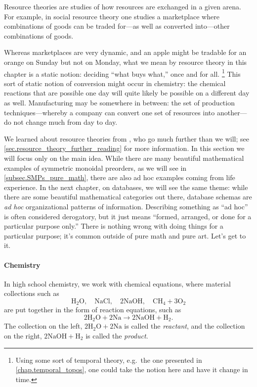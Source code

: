 \documentclass[7Sketches]{subfiles}
\begin{document}
Resource theories are studies of how resources are exchanged in a given arena. For example, in social resource theory one studies a marketplace where combinations of goods can be traded for---as well as converted into---other combinations of goods.

Whereas marketplaces are very dynamic, and an apple might be tradable for an orange on Sunday but not on Monday, what we mean by resource theory in this chapter is a static notion: deciding ``what buys what,'' once and for all.%
\footnote{Using some sort of temporal theory, e.g.\ the one presented in \cref{chap.temporal_topos}, one could take the notion here and have it change in time.}
This sort of static notion of conversion might occur in chemistry: the chemical reactions that are possible one day will quite likely be possible on a different day as well. Manufacturing may be somewhere in between: the set of production techniques---whereby a company can convert one set of resources into another---do not change much from day to day.

We learned about resource theories from
\cite{Coecke.Fritz.Spekkens:2016a,Fritz:2017a}, who go much further than we
will; see \cref{sec.resource_theory_further_reading} for more information.%
 In
this section we will focus only on the main idea. While there are many beautiful
mathematical examples of symmetric monoidal preorders, as we will see in
\cref{subsec.SMPs_pure_math}, there are also ad hoc examples coming from life
experience. In the next chapter, on databases, we will see the same theme: while
there are some beautiful mathematical categories out there, database schemas are
\emph{ad hoc} organizational patterns of information. Describing something as
``ad hoc'' is often considered derogatory, but it just means ``formed, arranged,
or done for a particular purpose only.'' There is nothing wrong with doing
things for a particular purpose; it's common outside of pure math and pure art. Let's get
to it.

\paragraph{Chemistry}%
\label{subsubsec.chemistry}%

In high school chemistry, we work with chemical equations, where material collections such as
\[\mathrm{H_2O},\quad \mathrm{NaCl},\quad \mathrm{2NaOH},\quad \mathrm{CH_4+3O_2}\]
are put together in the form of reaction equations, such as
\[\mathrm{2H_2O+2Na\to 2NaOH+H_2}.\]
The collection on the left, $\mathrm{2H_2O+2Na}$ is called the \emph{reactant}, and the collection on the right, $\mathrm{2NaOH+H_2}$ is called the \emph{product}.
\end{document}
